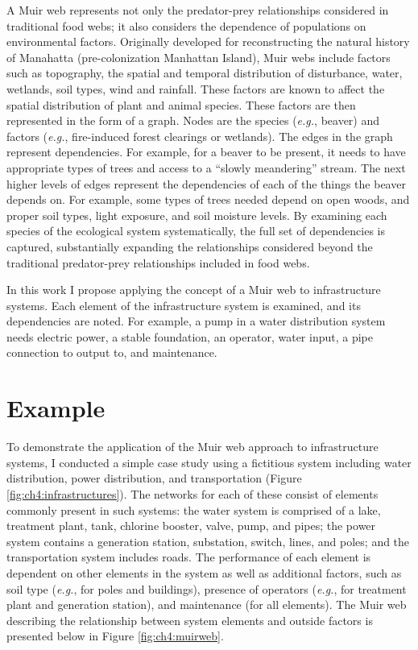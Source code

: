 A Muir web represents not only the predator-prey relationships considered in traditional food webs; it also considers the dependence of populations on environmental factors. Originally developed for reconstructing the natural history of Manahatta (pre-colonization Manhattan Island), Muir webs include factors such as topography, the spatial and temporal distribution of disturbance, water, wetlands, soil types, wind and rainfall.  These factors are known to affect the spatial distribution of plant and animal species. These factors are then represented in the form of a graph. Nodes are the species (\emph{e.g.}, beaver) and factors (\emph{e.g.}, fire-induced forest clearings or wetlands). The edges in the graph represent dependencies. For example, for a beaver to be present, it needs to have appropriate types of trees and access to a ``slowly meandering'' stream. The next higher levels of edges represent the dependencies of each of the things the beaver depends on. For example, some types of trees needed depend on open woods, and proper soil types, light exposure, and soil moisture levels. By examining each species of the ecological system systematically, the full set of dependencies is captured, substantially expanding the relationships considered beyond the traditional predator-prey relationships included in food webs.

In this work I propose applying the concept of a Muir web to infrastructure systems. Each element of the infrastructure system is examined, and its dependencies are noted. For example, a pump in a water distribution system needs electric power, a stable foundation, an operator, water input, a pipe connection to output to, and maintenance. 


\section{Example}
\label{sec:ch4:example}

To demonstrate the application of the Muir web approach to infrastructure systems, I conducted a simple case study using a fictitious system including water distribution, power distribution, and transportation (Figure \ref{fig:ch4:infrastructures}).  The networks for each of these consist of elements commonly present in such systems: the water system is comprised of a lake, treatment plant, tank, chlorine booster, valve, pump, and pipes; the power system contains a generation station, substation, switch, lines, and poles; and the transportation system includes roads.  The performance of each element is dependent on other elements in the system as well as additional factors, such as soil type (\emph{e.g.}, for poles and buildings), presence of operators (\emph{e.g.}, for treatment plant and generation station), and maintenance (for all elements).  The Muir web describing the relationship between system elements and outside factors is presented below in Figure \ref{fig:ch4:muirweb}.

